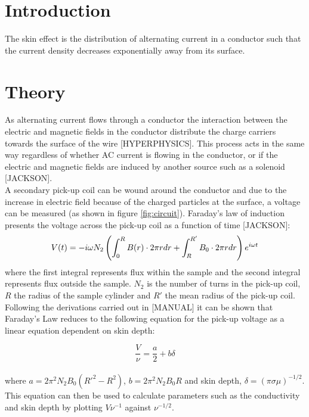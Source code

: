 \documentclass[a4paper,12pt,twocolumn]{article}
\begin{document}
\section{Introduction}
	The skin effect is the distribution of alternating current in a conductor such that the current density decreases exponentially away from its surface.
	
\section{Theory}

	As alternating current flows through a conductor the interaction between the electric and magnetic fields in the conductor distribute the charge carriers towards the surface of the wire [HYPERPHYSICS]. This process acts in the same way regardless of whether AC current is flowing in the conductor, or if the electric and magnetic fields are induced by another source such as a solenoid [JACKSON].\\
	
	A secondary pick-up coil can be wound around the conductor and due to the increase in electric field because of the charged particles at the surface, a voltage can be measured (as shown in figure \ref{fig:circuit}). Faraday's law of induction presents the voltage across the pick-up coil as a function of time [JACKSON]:
	\begin{equation}
		\scriptsize
		V(t) = - i \omega N_2 \left( \int_{0}^{R} B(r) \cdot 2\pi r dr + \int_{R}^{R'} B_0 \cdot 2\pi r dr \right) e^{i\omega t}
		\label{eq:faraday}
	\end{equation}
	where the first integral represents flux within the sample and the second integral represents flux outside the sample. $N_2$ is the number of turns in the pick-up coil, $R$ the radius of the sample cylinder and $R'$ the mean radius of the pick-up coil.\\
	
	Following the derivations carried out in [MANUAL] it can be shown that Faraday's Law reduces to the following equation for the pick-up voltage as a linear equation dependent on skin depth:
	
	\begin{equation}
		\frac{V}{\nu} = \frac{a}{2} + b\delta
		\label{eq:line}
	\end{equation}\\
	where $a = 2\pi^2 N_2 B_0 (R'^2-R^2)$, $b = 2\pi^2 N_2 B_0 R$ and skin depth, $\delta = (\pi \sigma \mu)^{-1/2}$. This equation can then be used to calculate parameters such as the conductivity and skin depth by plotting $V\nu^{-1}$ against $\nu^{-1/2}$.\\
	
\end{document}
